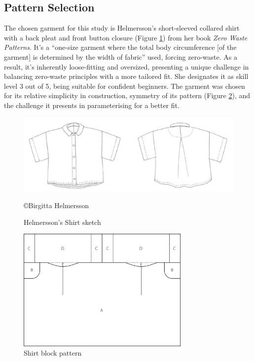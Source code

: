 \subsection{Pattern Selection}
The chosen garment for this study is Helmersson's short-sleeved collared shirt with a back pleat and front button closure (Figure \ref{fig:bh shirt sketch}) from her book \textit{Zero Waste Patterns}. It's a ``one-size garment where the total body circumference [of the garment] is determined by the width of fabric'' used, forcing zero-waste. As a result, it's inherently loose-fitting and oversized, presenting a unique challenge in balancing zero-waste principles with a more tailored fit. She designates it as skill level 3 out of 5, being suitable for confident beginners. The garment was chosen for its relative simplicity in construction, symmetry of its pattern (Figure \ref{fig:bh shirt pattern}), and the challenge it presents in parameterising for a better fit.
\begin{figure} [H]
    \centering
    \includegraphics[width = \textwidth]{Images/finishedgarmentsilhoutte.png}
    \caption{Helmersson's Shirt sketch}
    \copyright {Birgitta Helmersson} %
    \label{fig:bh shirt sketch}
\end{figure}
\begin{figure} [H]
    \centering
    \includegraphics[width = 0.75\textwidth]{Images/originalpattern_whole.png} 
    \caption{Shirt block pattern}
    \label{fig:bh shirt pattern}
\end{figure}
